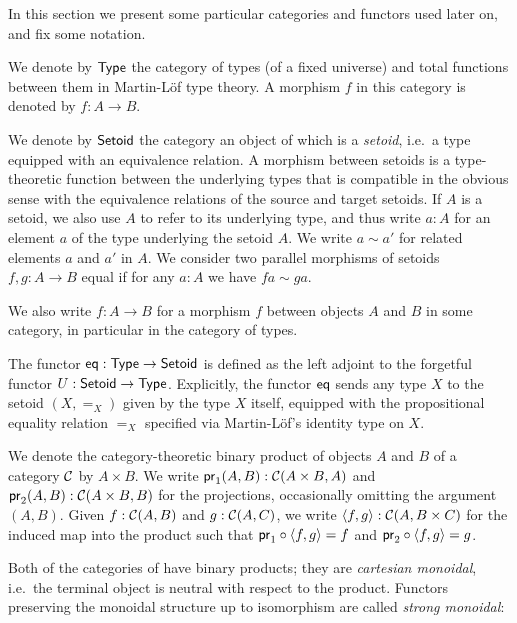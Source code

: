 \documentclass[envcountsame]{llncs}
\begin{document}
In this section we present some particular categories and functors used later on, and fix some notation.


\begin{definition}\label{def:set_setoid}
 We denote by $\Set$ the category of types (of a fixed universe) and total functions between them in Martin-L\"of type theory. 
 A morphism $f$ in this category is denoted by $f : A \to B$.
 
 We denote by $\Setoid$ the category an object of which is a \emph{setoid}, i.e.\ a type equipped with an equivalence relation.
 A morphism between setoids is a type-theoretic function between the underlying types that is compatible in the obvious sense with the equivalence relations of the source and target setoids.
 If $A$ is a setoid, we also use $A$ to refer to its underlying type, and thus write $a:A$ for an element $a$ of the type underlying the setoid $A$. 
 We write $a\sim a'$ for related elements $a$ and $a'$ in $A$.
 We consider two parallel morphisms of setoids $f,g:A\to B$ equal if for any $a:A$ we have $fa \sim ga$.
 
 We also write $f:A\to B$ for a morphism $f$ between objects $A$ and $B$ in some category, in particular in the category of types.
 \end{definition}



\begin{definition}\label{def:eq}
 The functor $\eq : \Set\to\Setoid$ is defined as the left adjoint to the forgetful functor $U : \Setoid \to \Set$.
  Explicitly, the functor $\eq$ sends any type $X$ to the setoid $(X,=_X)$ given by the type $X$ itself, equipped
  with the propositional equality relation $=_X$ specified via Martin-L\"of's identity type on $X$.
\end{definition}


\begin{remark}
  We denote the category-theoretic binary product of objects $A$ and $B$ of a category $\C$ by $A\times B$.
  We write $\pr_1(A,B) : \C(A\times B, A)$ and $\pr_2(A,B) :\C(A\times B, B)$ for the projections, occasionally omitting the 
  argument $(A,B)$.
  Given $f : \C(A, B)$ and $g : \C(A,C)$, we write $\langle f,g\rangle : \C(A,B\times C)$ for the induced map into the product such that
  $\comp{\langle f,g\rangle}{\pr_1} = f$ and $\comp{\langle f,g\rangle}{\pr_2} = g$.
\end{remark}

Both of the categories of  have binary products; they are \emph{cartesian monoidal}, i.e.\ the terminal 
object is neutral with respect to the product. Functors preserving the monoidal structure up to isomorphism
are called \emph{strong monoidal}:
\end{document}
